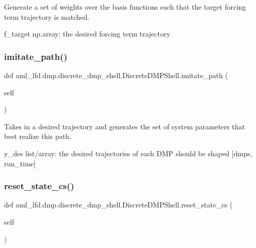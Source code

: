 \begin{DoxyVerb}Generate a set of weights over the basis functions such 
that the target forcing term trajectory is matched.

f_target np.array: the desired forcing term trajectory
\end{DoxyVerb}
 \hypertarget{classaml__lfd_1_1dmp_1_1discrete__dmp__shell_1_1_discrete_d_m_p_shell_a2036e592bfd791bf24f238f9636b42ff}{}\label{classaml__lfd_1_1dmp_1_1discrete__dmp__shell_1_1_discrete_d_m_p_shell_a2036e592bfd791bf24f238f9636b42ff} 
\subsubsection{\texorpdfstring{imitate\+\_\+path()}{imitate\_path()}}
{\footnotesize\ttfamily def aml\+\_\+lfd.\+dmp.\+discrete\+\_\+dmp\+\_\+shell.\+Discrete\+D\+M\+P\+Shell.\+imitate\+\_\+path (\begin{DoxyParamCaption}\item[{}]{self }\end{DoxyParamCaption})}

\begin{DoxyVerb}Takes in a desired trajectory and generates the set of 
system parameters that best realize this path.
    
y_des list/array: the desired trajectories of each DMP
          should be shaped [dmps, run_time]
\end{DoxyVerb}
 \hypertarget{classaml__lfd_1_1dmp_1_1discrete__dmp__shell_1_1_discrete_d_m_p_shell_a26c7a072996b7b5e2cdb13f19e3c3053}{}\label{classaml__lfd_1_1dmp_1_1discrete__dmp__shell_1_1_discrete_d_m_p_shell_a26c7a072996b7b5e2cdb13f19e3c3053} 
\subsubsection{\texorpdfstring{reset\+\_\+state\+\_\+cs()}{reset\_state\_cs()}}
{\footnotesize\ttfamily def aml\+\_\+lfd.\+dmp.\+discrete\+\_\+dmp\+\_\+shell.\+Discrete\+D\+M\+P\+Shell.\+reset\+\_\+state\+\_\+cs (\begin{DoxyParamCaption}\item[{}]{self }\end{DoxyParamCaption})}

